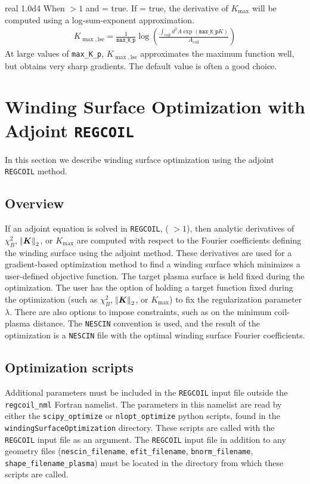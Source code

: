 \myhrule

{real}
{1.0d4}
{When $> 1$ and = true.}
{If  = true, the derivative of $K_{\max}$ will be computed using a log-sum-exponent approximation. 
\begin{gather}
K_{\max,\text{lse}} = \frac{1}{\texttt{max\_K\_p}} \log \left( \frac{\int_{\text{coil}} d^2 A \exp \left( \texttt{max\_K\_p}K \right)}{A_{\text{coil}}} \right)
\end{gather}
At large values of \texttt{max\_K\_p}, $K_{\max,\text{lse}}$ approximates the maximum function well, but obtains very sharp gradients. The default value is often a good choice. 
}

\myhrule

\chapter{Winding Surface Optimization with Adjoint \texttt{REGCOIL}}
\label{ch:adjoint}

In this section we describe winding surface optimization using the adjoint \texttt{REGCOIL} method. 

\section{Overview}

If an adjoint equation is solved in \texttt{REGCOIL}, ( $> 1$), then analytic derivatives of $\chi^2_B$, $\norm{\bm{K}}_2$, or $K_{\max}$ are computed with respect to the Fourier coefficients defining the winding surface using the adjoint method. These derivatives are used for a gradient-based optimization method to find a winding surface which minimizes a user-defined objective function. The target plasma surface is held fixed during the optimization. The user has the option of holding a target function fixed during the optimization (such as $\chi^2_B$, $\norm{\bm{K}}_2$, or $K_{\max}$) to fix the regularization parameter $\lambda$. There are also options to impose constraints, such as on the minimum coil-plasma distance. The \texttt{NESCIN} convention is used, and the result of the optimization is a \texttt{NESCIN} file with the optimal winding surface Fourier coefficients. 

\section{Optimization scripts}
Additional parameters must be included in the \texttt{REGCOIL} input file outside the \texttt{regcoil\_nml} Fortran namelist. The parameters in this namelist are read by either the \texttt{scipy\_optimize} or \texttt{nlopt\_optimize} python scripts, found in the \texttt{windingSurfaceOptimization} directory. These scripts are called with the \texttt{REGCOIL} input file as an argument. The \texttt{REGCOIL} input file in addition to any geometry files (\texttt{nescin\_filename}, \texttt{efit\_filename}, \texttt{bnorm\_filename}, \texttt{shape\_filename\_plasma}) must be located in the directory from which these scripts are called. 


